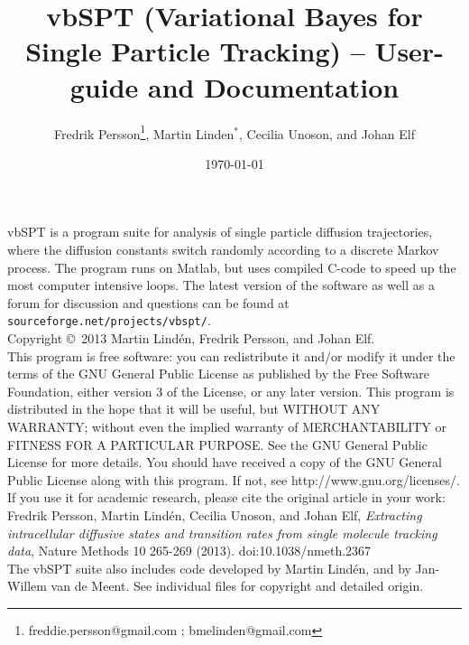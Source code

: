 \documentclass[11pt,a4paper]{article}
\title{vbSPT (Variational Bayes for Single Particle Tracking) -- User-guide and Documentation}
\author{Fredrik Persson\footnote{freddie.persson@gmail.com ; bmelinden@gmail.com},
Martin Linden$^*$, Cecilia Unoson, and Johan Elf}
\date{\today}
\begin{document}
\maketitle 

\noindent vbSPT is a program suite for analysis of single particle diffusion
trajectories, where the diffusion constants switch randomly according
to a discrete Markov process. The program runs on Matlab, but uses
compiled C-code to speed up the most computer intensive loops.  The
latest version of the software as well as a forum for discussion and
questions can be found at \texttt{sourceforge.net/projects/vbspt/}.\medskip\\

\noindent Copyright \copyright \  2013 Martin Lind\'en, Fredrik Persson, and
Johan Elf.\medskip\\
 
\noindent This program is free software: you can redistribute it
and/or modify it under the terms of the GNU General Public License as
published by the Free Software Foundation, either version 3 of the
License, or any later version.  This program is distributed in the
hope that it will be useful, but WITHOUT ANY WARRANTY; without even
the implied warranty of MERCHANTABILITY or FITNESS FOR A PARTICULAR
PURPOSE. See the GNU General Public License for more details. You
should have received a copy of the GNU General Public License along
with this program. If not, see http://www.gnu.org/licenses/.\medskip\\

\noindent If you use it for academic research, please cite the
original article in your work:\medskip\\
\noindent Fredrik Persson, Martin Lind\'en, Cecilia Unoson, and Johan
Elf, \emph{Extracting intracellular diffusive states and transition
  rates from single molecule tracking data}, Nature Methods 10 265-269
(2013). doi:10.1038/nmeth.2367 \medskip\\

\noindent The vbSPT suite also includes code developed by Martin
Lind\'en, and by Jan-Willem van de Meent. See individual files for
copyright and detailed origin.
\end{document}
